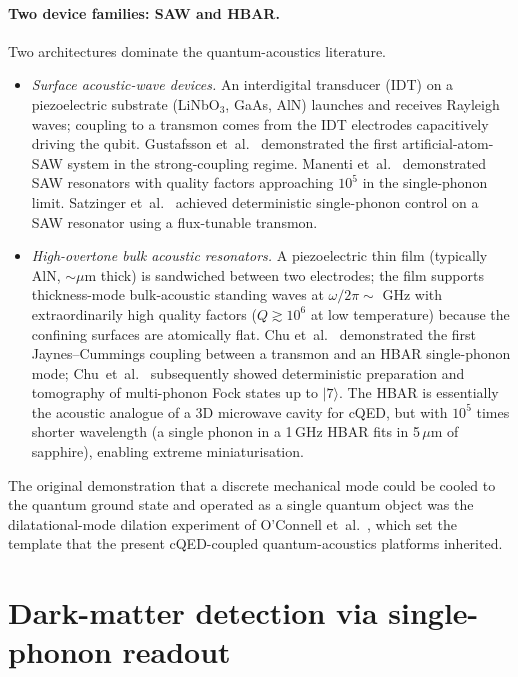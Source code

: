 \paragraph{Two device families: SAW and HBAR.}
Two architectures dominate the quantum-acoustics literature.
\begin{itemize}
  \item \emph{Surface acoustic-wave devices.}
        An interdigital transducer (IDT) on a piezoelectric
        substrate (LiNbO$_3$, GaAs, AlN) launches and receives
        Rayleigh waves; coupling to a transmon comes from the IDT
        electrodes capacitively driving the qubit. Gustafsson
        et~al.~\cite{gustafsson2014} demonstrated the first
        artificial-atom-SAW system in the strong-coupling regime.
        Manenti et~al.~\cite{manenti2016} demonstrated SAW
        resonators with quality factors approaching $10^5$ in the
        single-phonon limit. Satzinger et~al.~\cite{satzinger2018}
        achieved deterministic single-phonon control on a SAW
        resonator using a flux-tunable transmon.
  \item \emph{High-overtone bulk acoustic resonators.}
        A piezoelectric thin film (typically AlN, $\sim\mu$m
        thick) is sandwiched between two electrodes; the film
        supports thickness-mode bulk-acoustic standing waves at
        $\omega/2\pi\sim$ GHz with extraordinarily high quality
        factors ($Q\gtrsim 10^{6}$ at low temperature) because the
        confining surfaces are atomically flat. Chu
        et~al.~\cite{chu2017} demonstrated the first
        Jaynes--Cummings coupling between a transmon and an HBAR
        single-phonon mode; Chu~et~al.~\cite{chu2018} subsequently
        showed deterministic preparation and tomography of
        multi-phonon Fock states up to $|7\rangle$. The HBAR is
        essentially the acoustic analogue of a 3D microwave
        cavity for cQED, but with $10^5$ times shorter wavelength
        (a single phonon in a 1\,GHz HBAR fits in 5\,$\mu$m of
        sapphire), enabling extreme miniaturisation.
\end{itemize}
The original demonstration that a discrete mechanical mode could
be cooled to the quantum ground state and operated as a single
quantum object was the dilatational-mode dilation experiment of
O'Connell et~al.~\cite{oconnell2010}, which set the template that
the present cQED-coupled quantum-acoustics platforms inherited.

\section{Dark-matter detection via single-phonon readout}
\label{sec:phonon-dm}


